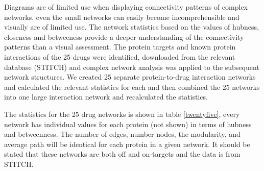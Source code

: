 \documentclass[preprint,11pt]{elsarticle}
\begin{document}
Diagrams are of limited use when displaying connectivity patterns of complex networks, even the small networks can easily become incomprehensible  and visually are of limited use. The network statistics based on the values of hubness, closeness and betweeness provide a deeper understanding of the connectivity patterns than a visual assessment. The protein targets and known protein interactions of the 25 drugs were identified, downloaded from the relevant database (STITCH) and complex network analysis was applied to the subsequent network structures.  We created 25 separate protein-to-drug interaction networks and calculated the relevant statistics for each and then combined the 25 networks into one large interaction network and recalculated the statistics. 

The statistics for the 25 drug networks is shown in table \ref{twentyfive}, every network has individual values for each protein (not shown) in terms of hubness and betweenness. The number of edges, number nodes, the modularity, and average path will be identical for each protein in a given network. It should be stated that these networks are both off and on-targets and the data is from STITCH.
\end{document}
